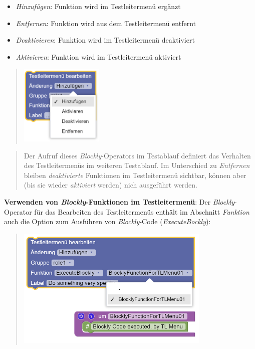 \documentclass[
  letterpaper,
  DIV=11]{scrreprt}
\providecommand{\tightlist}{%
  \setlength{\itemsep}{0pt}\setlength{\parskip}{0pt}}\usepackage{longtable,booktabs,array}
\begin{document}
\begin{tcolorbox}
\begin{itemize}
\tightlist
\item
  \emph{Hinzufügen}: Funktion wird im Testleitermenü ergänzt
\item
  \emph{Entfernen}: Funktion wird aus dem Testleitermenü entfernt
\item
  \emph{Deaktivieren}: Funktion wird im Testleitermenü deaktiviert
\item
  \emph{Aktivieren}: Funktion wird im Testleitermenü aktiviert
\end{itemize}

\begin{quote}
\includegraphics[width=1.5625in,height=\textheight]{img/screenshot-blockly-element-for-testadminstrator-menu-example-02-DEU.png}
\end{quote}

\begin{quote}
Der Aufruf dieses \emph{Blockly}-Operators im Testablauf definiert das
Verhalten des Testleitermenüs im weiteren Testablauf. Im Unterschied zu
\emph{Entfernen} bleiben \emph{deaktivierte} Funktionen im
Testleitermenü sichtbar, können aber (bis sie wieder \emph{aktiviert}
werden) nich ausgeführt werden.
\end{quote}

\textbf{Verwenden von \emph{Blockly}-Funktionen im Testleitermenü}: Der
\emph{Blockly}-Operator für das Bearbeiten des Testleitermenüs enthält
im Abschnitt \emph{Funktion} auch die Option zum Ausführen von
\emph{Blockly}-Code (\emph{ExecuteBockly}):

\begin{quote}
\includegraphics[width=3.64583in,height=\textheight]{img/screenshot-blockly-element-for-testadminstrator-menu-function-example-01-DEU.png}
\end{quote}


\end{tcolorbox}
\end{document}
